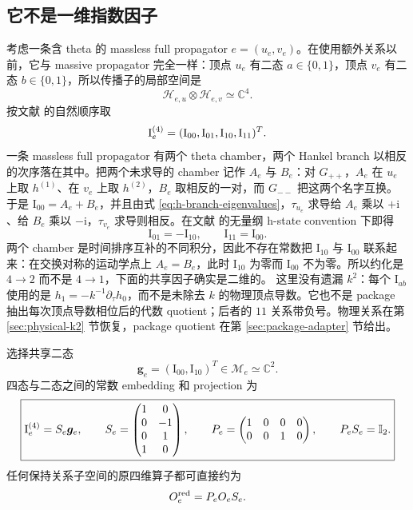 \documentclass[11pt,a4paper]{ctexart}
\newcommand{\ii}{\mathrm i}
\newcommand{\Id}{\mathbb I}
\newcommand{\cH}{\mathcal H}
\newcommand{\cM}{\mathcal M}
\begin{document}
\subsection{它不是一维指数因子}

考虑一条含 theta 的 massless full propagator $e=(u_e,v_e)$。在使用额外关系以前，它与 massive propagator 完全一样：顶点 $u_e$ 有二态 $a\in\{0,1\}$，顶点 $v_e$ 有二态 $b\in\{0,1\}$，所以传播子的局部空间是
\begin{equation}
 \cH_{e,u}\otimes\cH_{e,v}\simeq\mathbb C^4.
\end{equation}
按文献 \cite{Chen:2023eic} 的自然顺序取
\begin{equation}
 \bm{\text I}_e^{(4)}
 =(\text{I}_{00},\text{I}_{01},\text{I}_{10},\text{I}_{11})^T.
\end{equation}
一条 massless full propagator 有两个 theta chamber，两个 Hankel branch 以相反的次序落在其中。把两个未求导的 chamber 记作 $A_e$ 与 $B_e$：对 $G_{++}$，$A_e$ 在 $u_e$ 上取 $h^{(1)}$、在 $v_e$ 上取 $h^{(2)}$，$B_e$ 取相反的一对，而 $G_{--}$ 把这两个名字互换。于是 $\text{I}_{00}=A_e+B_e$，并且由式 \eqref{eq:h-branch-eigenvalues}，$\tau_{u_e}$ 求导给 $A_e$ 乘以 $+\ii$、给 $B_e$ 乘以 $-\ii$，$\tau_{v_e}$ 求导则相反。在文献 \cite{Chen:2023eic} 的无量纲 h-state convention 下即得
\begin{equation}
 \text{I}_{01}=-\text{I}_{10},
 \qquad
 \text{I}_{11}=\text{I}_{00}.
 \label{eq:h-state-massless-relations}
\end{equation}
两个 chamber 是时间排序互补的不同积分，因此不存在常数把 $\text{I}_{10}$ 与 $\text{I}_{00}$ 联系起来：在交换对称的运动学点上 $A_e=B_e$，此时 $\text{I}_{10}$ 为零而 $\text{I}_{00}$ 不为零。所以约化是 $4\to2$ 而不是 $4\to1$，下面的共享因子确实是二维的。
这里没有遗漏 $k^2$：每个 $\text{I}_{ab}$ 使用的是 $h_1=-k^{-1}\partial_\tau h_0$，而不是未除去 $k$ 的物理顶点导数。它也不是 package 抽出每次顶点导数相位后的代数 quotient；后者的 $11$ 关系带负号。物理关系在第 \ref{sec:physical-k2} 节恢复，package quotient 在第 \ref{sec:package-adapter} 节给出。

选择共享二态
\begin{equation}
 \bm g_e=(\text{I}_{00},\text{I}_{10})^T\in\cM_e\simeq\mathbb C^2.
\end{equation}
四态与二态之间的常数 embedding 和 projection 为
\begin{equation}
 \boxed{
 \bm{\text I}_e^{(4)}=S_e\bm g_e,
 \qquad
 S_e=
 \begin{pmatrix}
 1&0\\
 0&-1\\
 0&1\\
 1&0
 \end{pmatrix},
 \qquad
 P_e=
 \begin{pmatrix}
 1&0&0&0\\
 0&0&1&0
 \end{pmatrix},
 \qquad P_eS_e=\Id_2.
 }
 \label{eq:SP-massless}
\end{equation}
任何保持关系子空间的原四维算子都可直接约为
\begin{equation}
 O_e^{\rm red}=P_eO_eS_e.
 \label{eq:POS-reduction}
\end{equation}
\end{document}
